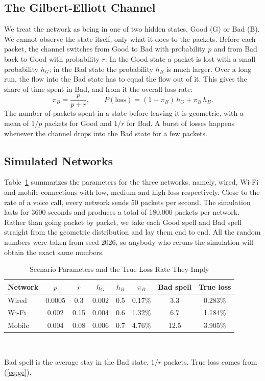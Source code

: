 \documentclass[conference]{IEEEtran}
\begin{document}
\subsection{The Gilbert-Elliott Channel}
We treat the network as being in one of two hidden states, Good (G) or Bad (B). We cannot observe the state itself, only what it does to the packets. Before each packet, the channel switches from Good to Bad with probability $p$ and from Bad back to Good with probability $r$. In the Good state a packet is lost with a small probability $h_G$; in the Bad state the probability $h_B$ is much larger. Over a long run, the flow into the Bad state has to equal the flow out of it. This gives the share of time spent in Bad, and from it the overall loss rate:
\begin{equation}
\pi_B=\frac{p}{p+r},\qquad P(\text{loss})=(1-\pi_B)\,h_G+\pi_B\,h_B .
\label{eq:ge}
\end{equation}
The number of packets spent in a state before leaving it is geometric, with a mean of $1/p$ packets for Good and $1/r$ for Bad. A burst of losses happens whenever the channel drops into the Bad state for a few packets.

\subsection{Simulated Networks}
Table~\ref{tab:params} summarizes the parameters for the three networks, namely, wired, Wi-Fi and mobile connections with low, medium and high loss respectively. Close to the rate of a voice call, every network sends 50 packets per second. The simulation lasts for 3600 seconds and produces a total of 180,000 packets per network. Rather than going packet by packet, we take each Good spell and Bad spell straight from the geometric distribution and lay them end to end. All the random numbers were taken from seed 2026, so anybody who reruns the simulation will obtain the exact same numbers.

\begin{table}[!t]
\caption{Scenario Parameters and the True Loss Rate They Imply}
\label{tab:params}
\centering
\footnotesize
\setlength{\tabcolsep}{3.2pt}
\begin{tabular}{lccccccc}
\toprule
Network & $p$ & $r$ & $h_G$ & $h_B$ & $\pi_B$ & Bad spell & True loss \\
\midrule
Wired & 0.0005 & 0.3 & 0.002 & 0.5 & 0.17\% & 3.3 & 0.283\% \\
Wi-Fi & 0.002 & 0.15 & 0.004 & 0.6 & 1.32\% & 6.7 & 1.184\% \\
Mobile & 0.004 & 0.08 & 0.006 & 0.7 & 4.76\% & 12.5 & 3.905\% \\
\bottomrule
\end{tabular}
\\[2pt]
\raggedright\scriptsize Bad spell is the average stay in the Bad state, $1/r$ packets. True loss comes from (\ref{eq:ge}).
\end{table}
\end{document}
